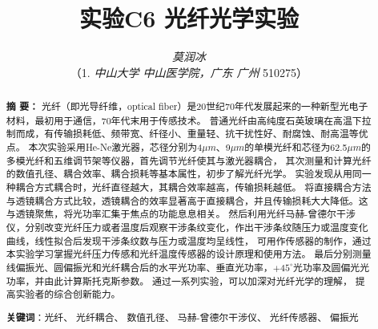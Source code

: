 \documentclass[10pt,a4paper,twoside,UTF8]{ctexart}
\begin{document}
\title{\LARGE\textbf{实验C6 光纤光学实验}\footnotemark[1]}
\author{\large\textit{莫润冰\footnotemark[2]}
\\ \normalsize{（1. \textit{中山大学 中山医学院，广东 广州 }510275）}}
\date{}%


	\maketitle  %
  	\renewcommand{\abstractname} {} %
	\begin{abstract}
	\vspace{-3em}
	{\bf 摘{} 要：}
	{\small 
	光纤（即光导纤维，optical fiber）是20世纪70年代发展起来的一种新型光电子材料，最初用于通信，70年代末用于传感技术。
	普通光纤由高纯度石英玻璃在高温下拉制而成，有传输损耗低、频带宽、纤径小、重量轻、抗干扰性好、耐腐蚀、耐高温等优点。 
	本次实验采用He-Ne激光器，芯径分别为4$\mu m$、9$\mu m$的单模光纤和芯径为62.5$\mu m$的多模光纤和五维调节架等仪器，首先调节光纤使其与激光器耦合，
	其次测量和计算光纤的数值孔径、耦合效率、耦合损耗等基本属性，初步了解光纤光学。
	实验发现从用同一种耦合方式耦合时，光纤直径越大，其耦合效率越高，传输损耗越低。
	将直接耦合方法与透镜耦合方式比较，透镜耦合的效率显著高于直接耦合，并且传输损耗大大降低。这与透镜聚焦，将光功率汇集于焦点的功能息息相关。
	然后利用光纤马赫-曾德尔干涉仪，分别改变光纤压力或者温度后观察干涉条纹变化，作出干涉条纹随压力或温度变化曲线，线性拟合后发现干涉条纹数与压力或温度均呈线性，
	可用作传感器的制作，通过本实验学习掌握光纤压力传感和光纤温度传感器的设计原理和使用方法。
	最后分别测量线偏振光、圆偏振光和光纤耦合后的水平光功率、垂直光功率，$+45^{\circ}$光功率及圆偏光光功率，并由此计算斯托克斯参数。
	通过一系列实验，可以加深对光纤光学的理解， 提高实验者的综合创新能力。}

	\par%
	\textbf{关键词}：光纤、 光纤耦合、 数值孔径、 马赫-曾德尔干涉仪、 光纤传感器、 偏振光
	\vspace{2em}
	\end{abstract}

\renewcommand{\thefootnote}{\fnsymbol{footnote}}
\end{document}
